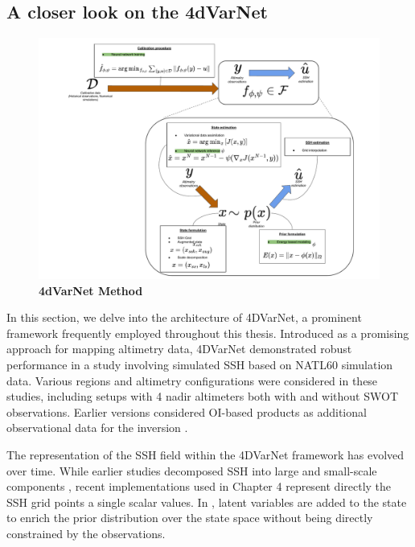 \begin{bibunit}
\section{A closer look on the 4dVarNet}
\begin{figure}[h]
    \centering
    \includegraphics[width=\textwidth]{00_LitReview/Method-4dvarnet.pdf}
    \caption{\textbf{4dVarNet Method}}
    \label{c2fig:method4}
\end{figure}
In this section, we delve into the architecture of 4DVarNet, a prominent framework frequently employed throughout this thesis. 
Introduced as a promising approach for mapping altimetry data, 4DVarNet demonstrated robust performance in a study involving simulated SSH based on NATL60 simulation data\cite{fabletENDTOENDPHYSICSINFORMEDREPRESENTATION2021}. Various regions \cite{beauchamp4DVarNetSSHEndtoendLearning2023} and altimetry configurations were considered in these studies, including setups with 4 nadir altimeters both with and without SWOT observations. Earlier versions considered OI-based products as additional observational data for the inversion \cite{fabletENDTOENDPHYSICSINFORMEDREPRESENTATION2021}.

The representation of the SSH field within the 4DVarNet framework has evolved over time. While earlier studies decomposed SSH into large and small-scale components \cite{beauchampDatadrivenLearningbasedInterpolations2021}, recent implementations used in Chapter 4 represent directly the SSH grid points a single scalar values. In  \cite{fabletENDTOENDPHYSICSINFORMEDREPRESENTATION2021}, latent variables are added to the state to enrich the prior distribution over the state space without being directly constrained by the observations.


\end{bibunit}
